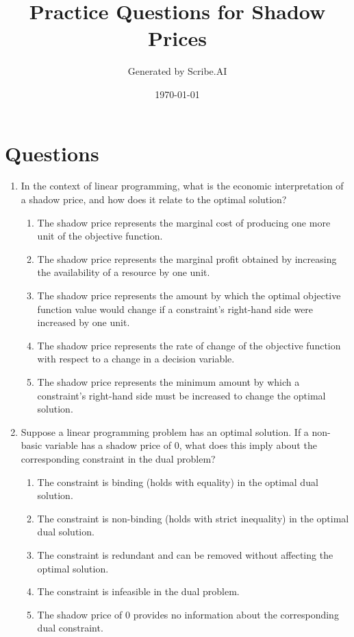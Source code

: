 \documentclass{article}%
\title{Practice Questions for Shadow Prices}%
\author{Generated by Scribe.AI}%
\date{\today}%
\begin{document}
%
\normalsize%
\maketitle%
\section{Questions}%
\label{sec:Questions}%
\begin{enumerate}%
\item In the context of linear programming, what is the economic interpretation of a shadow price, and how does it relate to the optimal solution?%
\begin{enumerate}%
\item The shadow price represents the marginal cost of producing one more unit of the objective function.%
\item The shadow price represents the marginal profit obtained by increasing the availability of a resource by one unit.%
\item The shadow price represents the amount by which the optimal objective function value would change if a constraint's right-hand side were increased by one unit.%
\item The shadow price represents the rate of change of the objective function with respect to a change in a decision variable.%
\item The shadow price represents the minimum amount by which a constraint's right-hand side must be increased to change the optimal solution.%
\end{enumerate}%
\vspace{1em}%
\item Suppose a linear programming problem has an optimal solution.  If a non-basic variable has a shadow price of 0, what does this imply about the corresponding constraint in the dual problem?%
\begin{enumerate}%
\item The constraint is binding (holds with equality) in the optimal dual solution.%
\item The constraint is non-binding (holds with strict inequality) in the optimal dual solution.%
\item The constraint is redundant and can be removed without affecting the optimal solution.%
\item The constraint is infeasible in the dual problem.%
\item The shadow price of 0 provides no information about the corresponding dual constraint.%

\end{enumerate}
\end{enumerate}
\end{document}

